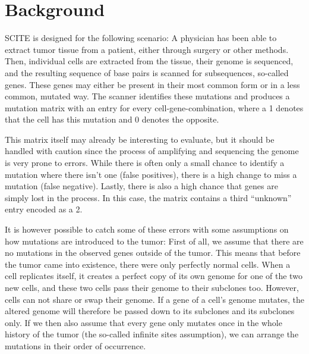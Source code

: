 \section{Background}

\ac{SCITE} is designed for the following scenario: A physician has been able to extract tumor tissue from a patient, either through surgery or other methods. Then, individual cells are extracted from the tissue, their genome is sequenced, and the resulting sequence of base pairs is scanned for subsequences, so-called genes. These genes may either be present in their most common form or in a less common, mutated way. The scanner identifies these mutations and produces a mutation matrix with an entry for every cell-gene-combination, where a 1 denotes that the cell has this mutation and 0 denotes the opposite.

This matrix itself may already be interesting to evaluate, but it should be handled with caution since the process of amplifying and sequencing the genome is very prone to errors. While there is often only a small chance to identify a mutation where there isn't one (false positives), there is a high change to miss a mutation (false negative). Lastly, there is also a high chance that genes are simply lost in the process. In this case, the matrix contains a third ``unknown'' entry encoded as a 2.


It is however possible to catch some of these errors with some assumptions on how mutations are introduced to the tumor: First of all, we assume that there are no mutations in the observed genes outside of the tumor. This means that before the tumor came into existence, there were only perfectly normal cells. When a cell replicates itself, it creates a perfect copy of its own genome for one of the two new cells, and these two cells pass their genome to their subclones too. However, cells can not share or swap their genome. If a gene of a cell's genome mutates, the altered genome will therefore be passed down to its subclones and its subclones only. If we then also assume that every gene only mutates once in the whole history of the tumor (the so-called infinite sites assumption), we can arrange the mutations in their order of occurrence.

